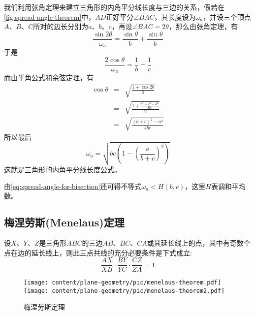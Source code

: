 \begin{example}[三角形的角平分线长度公式]
  我们利用张角定理来建立三角形的内角平分线长度与三边的关系，假若在\autoref{fig:spread-angle-theorem}中，$AD$正好平分$\angle BAC$，其长度设为$\omega_a$，并设三个顶点$A$、$B$、$C$所对的边长分别为$a$、$b$、$c$，再设$\angle BAC=2\theta$，那么由张角定理，有
  \[ \frac{\sin{2\theta}}{\omega_a} = \frac{\sin{\theta}}{b}+\frac{\sin{\theta}}{b} \]
  于是
  \begin{equation}
    \label{eq:spread-angle-for-bisection}
  \frac{2\cos{\theta}}{\omega_a} = \frac{1}{b} + \frac{1}{c}
  \end{equation}
  而由半角公式和余弦定理，有
  \begin{eqnarray*}
    \cos{\theta} & = & \sqrt{\frac{1+\cos{2\theta}}{2}} \\
                 & = & \sqrt{\frac{1+\frac{b^2+c^2-a^2}{2bc}}{2}} \\
    & = & \sqrt{\frac{(b+c)^2-a^2}{4bc}}
  \end{eqnarray*}
  所以最后
  \[ \omega_a = \sqrt{bc \left( 1- \left( \frac{a}{b+c} \right)^2 \right)} \]
  这就是三角形的内角平分线长度公式。

  由\autoref{eq:spread-angle-for-bisection}还可得不等式$\omega_a < H(b,c)$，这里$H$表调和平均数。
\end{example}

\subsection{梅涅劳斯(Menelaus)定理}
\label{sec:menelaus-theorem}

\begin{theorem}[梅涅劳斯定理]
  设$X$、$Y$、$Z$是三角形$ABC$的三边$AB$、$BC$、$CA$或其延长线上的点，其中有奇数个点在边的延长线上，则此三点共线的充分必要条件是下式成立:
  \begin{equation}
    \label{eq:menelaus-theorem}
    \frac{AX}{XB} \cdot \frac{BY}{YC} \cdot \frac{CZ}{ZA} = 1
 \end{equation}
\end{theorem}
 
\begin{figure}[htbp]
\centering
\texttt{[image: content/plane-geometry/pic/menelaus-theorem.pdf]}
\texttt{[image: content/plane-geometry/pic/menelaus-theorem2.pdf]}
\caption{梅涅劳斯定理}
\label{fig:menelaus-theorem}
\end{figure}
 

